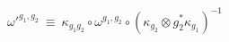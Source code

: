 \begin{equation}    \label{omegacobound}
\omega'^{g_1, g_2} \: \equiv \:
\kappa_{g_1 g_2} \circ \omega^{g_1, g_2} \circ
\left( \kappa_{g_2} \otimes g_2^* \kappa_{g_1} \right)^{-1}
\end{equation}

